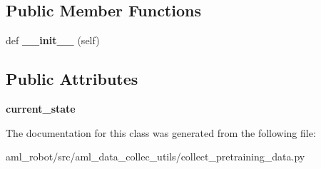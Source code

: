 \subsection*{Public Member Functions}
\begin{DoxyCompactItemize}
\item 
\hypertarget{classaml__data__collec__utils_1_1collect__pretraining__data_1_1_agent_proxy_a3ab6c2768994ad0a42160cbb1c8e4cfa}{}\label{classaml__data__collec__utils_1_1collect__pretraining__data_1_1_agent_proxy_a3ab6c2768994ad0a42160cbb1c8e4cfa} 
def {\bfseries \+\_\+\+\_\+init\+\_\+\+\_\+} (self)
\end{DoxyCompactItemize}
\subsection*{Public Attributes}
\begin{DoxyCompactItemize}
\item 
\hypertarget{classaml__data__collec__utils_1_1collect__pretraining__data_1_1_agent_proxy_aeb2225b6b78553e00dfa022cd7bafd49}{}\label{classaml__data__collec__utils_1_1collect__pretraining__data_1_1_agent_proxy_aeb2225b6b78553e00dfa022cd7bafd49} 
{\bfseries current\+\_\+state}
\end{DoxyCompactItemize}


The documentation for this class was generated from the following file\+:\begin{DoxyCompactItemize}
\item 
aml\+\_\+robot/src/aml\+\_\+data\+\_\+collec\+\_\+utils/collect\+\_\+pretraining\+\_\+data.\+py\end{DoxyCompactItemize}

